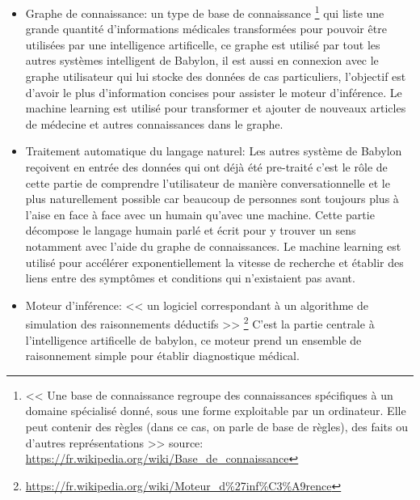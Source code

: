             \begin{itemize}
                \item Graphe de connaissance: un type de base de connaissance
                    \footnote{
                        << Une base de connaissance regroupe des connaissances spécifiques à un 
                        domaine spécialisé donné, sous une forme exploitable par un ordinateur. 
                        Elle peut contenir des règles (dans ce cas, on parle de base de règles), 
                        des faits ou d'autres représentations >> \newline 
                        source: \url{https://fr.wikipedia.org/wiki/Base_de_connaissance}
                    }
                    qui liste une grande quantité d'informations médicales transformées 
                    pour pouvoir être utilisées par une intelligence artificelle, 
                    ce graphe est utilisé par tout les autres systèmes intelligent 
                    de Babylon, il est aussi en connexion avec le graphe utilisateur 
                    qui lui stocke des données de cas particuliers,
                    l'objectif est d'avoir le plus d'information concises 
                    pour assister le moteur d'inférence. 
                    Le machine learning est utilisé pour transformer et ajouter de nouveaux articles 
                    de médecine et autres connaissances dans le graphe.
                    \newline

                \item Traitement automatique du langage naturel: 
                Les autres système de Babylon reçoivent en entrée des données qui ont déjà 
                été pre-traité c'est le rôle de cette partie de comprendre l'utilisateur 
                de manière conversationnelle et le plus naturellement possible car
                beaucoup de personnes sont toujours plus à l'aise en face à face 
                avec un humain qu'avec une machine. Cette partie décompose 
                le langage humain parlé et écrit pour y trouver un sens notamment avec l'aide 
                du graphe de connaissances. Le machine learning est utilisé pour accélérer exponentiellement 
                la vitesse de recherche et établir des liens entre des symptômes et conditions 
                qui n'existaient pas avant.
                \newline

                \item Moteur d'inférence: 
                << un logiciel correspondant à un algorithme de simulation des raisonnements déductifs >>
                \footnote{\url{https://fr.wikipedia.org/wiki/Moteur_d\%27inf\%C3\%A9rence}}
                C'est la partie centrale à l'intelligence artificelle de babylon, ce moteur 
                prend un ensemble de raisonnement simple pour établir diagnostique médical.
                \newline
            \end{itemize} 
            \newpage


